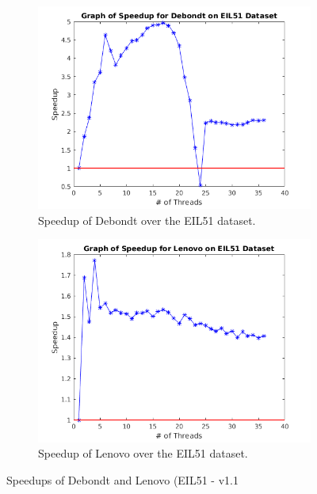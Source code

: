 \documentclass[10pt,letterpaper]{article}
\begin{document}
\begin{figure}[t]
\centering
  \begin{subfigure}{0.49\linewidth} \centering
	\includegraphics[width=\textwidth]{../img/Debondt_speedup.png}
    \caption{Speedup of Debondt over the EIL51 dataset.}\label{fig:figA}
  \end{subfigure}
  \begin{subfigure}{0.49\linewidth} \centering
	\includegraphics[width=\textwidth]{../img/Lenovo_Speedup.png}
    \caption{Speedup of Lenovo over the EIL51 dataset.}\label{fig:figB}
  \end{subfigure}
\caption{Speedups of Debondt and Lenovo (EIL51 - v1.1} \label{fig:EILspeedups}
\end{figure}
\end{document}
